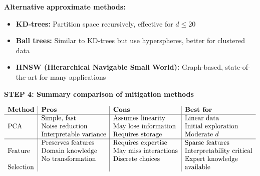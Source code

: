 \documentclass[12pt]{article}
\begin{document}
\begin{solution}
\textbf{Alternative approximate methods:}
\begin{itemize}
    \item \textbf{KD-trees:} Partition space recursively, effective for \(d \leq 20\)
    \item \textbf{Ball trees:} Similar to KD-trees but use hyperspheres, better for clustered data
    \item \textbf{HNSW (Hierarchical Navigable Small World):} Graph-based, state-of-the-art for many applications
\end{itemize}

\textbf{STEP 4: Summary comparison of mitigation methods}

\[
\begin{array}{l|l|l|l}
\textbf{Method} & \textbf{Pros} & \textbf{Cons} & \textbf{Best for} \\
\hline
\text{PCA} & \begin{tabular}{@{}l@{}} Simple, fast \\ Noise reduction \\ Interpretable variance \end{tabular} & \begin{tabular}{@{}l@{}} Assumes linearity \\ May lose information \\ Requires storage \end{tabular} & \begin{tabular}{@{}l@{}} Linear data \\ Initial exploration \\ Moderate \(d\) \end{tabular} \\
\hline
\text{Feature} & \begin{tabular}{@{}l@{}} Preserves features \\ Domain knowledge \\ No transformation \end{tabular} & \begin{tabular}{@{}l@{}} Requires expertise \\ May miss interactions \\ Discrete choices \end{tabular} & \begin{tabular}{@{}l@{}} Sparse features \\ Interpretability critical \\ Expert knowledge \end{tabular} \\
\text{Selection} & & & \text{available} \\

\end{array}\]
\end{solution}
\end{document}
